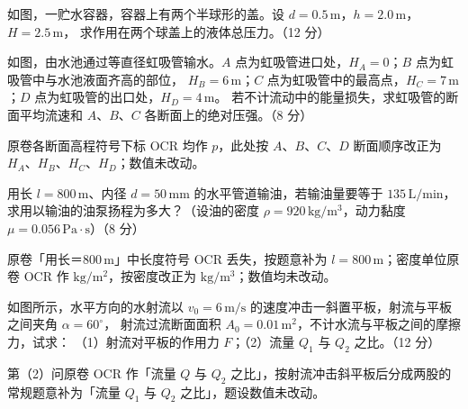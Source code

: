 \begin{ti}
  \item 如图，一贮水容器，容器上有两个半球形的盖。设 $d=0.5\,\mathrm{m}$，$h=2.0\,\mathrm{m}$，$H=2.5\,\mathrm{m}$，
  求作用在两个球盖上的液体总压力。（12 分）\hfill{}

  \item 如图，由水池通过等直径虹吸管输水。$A$ 点为虹吸管进口处，$H_A=0$；$B$ 点为虹吸管中与水池液面齐高的部位，
  $H_B=6\,\mathrm{m}$；$C$ 点为虹吸管中的最高点，$H_C=7\,\mathrm{m}$；$D$ 点为虹吸管的出口处，$H_D=4\,\mathrm{m}$。
  若不计流动中的能量损失，求虹吸管的断面平均流速和 $A$、$B$、$C$ 各断面上的绝对压强。（8 分）\hfill{}
  \begin{tishi}原卷各断面高程符号下标 OCR 均作 $p$，此处按 $A$、$B$、$C$、$D$ 断面顺序改正为 $H_A$、$H_B$、$H_C$、$H_D$；数值未改动。\end{tishi}

  \item 用长 $l=800\,\mathrm{m}$、内径 $d=50\,\mathrm{mm}$ 的水平管道输油，若输油量要等于 $135\,\mathrm{L/min}$，
  求用以输油的油泵扬程为多大？（设油的密度 $\rho=920\,\mathrm{kg/m^3}$，动力黏度 $\mu=0.056\,\mathrm{Pa\cdot s}$）（8 分）\hfill{}
  \begin{tishi}原卷「用长＝800\,m」中长度符号 OCR 丢失，按题意补为 $l=800\,\mathrm{m}$；密度单位原卷 OCR 作 $\mathrm{kg/m^2}$，按密度改正为 $\mathrm{kg/m^3}$；数值均未改动。\end{tishi}

  \item 如图所示，水平方向的水射流以 $v_0=6\,\mathrm{m/s}$ 的速度冲击一斜置平板，射流与平板之间夹角 $\alpha=60^\circ$，
  射流过流断面面积 $A_0=0.01\,\mathrm{m^2}$，不计水流与平板之间的摩擦力，试求：
  （1）射流对平板的作用力 $F$；（2）流量 $Q_1$ 与 $Q_2$ 之比。（12 分）\hfill{}
  \begin{tishi}第（2）问原卷 OCR 作「流量 $Q$ 与 $Q_2$ 之比」，按射流冲击斜平板后分成两股的常规题意补为「流量 $Q_1$ 与 $Q_2$ 之比」，题设数值未改动。\end{tishi}


\end{ti}
